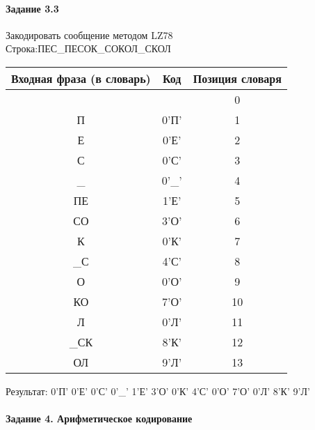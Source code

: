 \documentclass[a4paper, 12pt]{article}
\begin{document}
\paragraph{Задание 3.3}

Закодировать сообщение методом LZ78\\
Строка:ПЕС\_ПЕСОК\_СОКОЛ\_СКОЛ\\
\begin{table}[h!]
\centering
\begin{tabular}{|c|c|c|} 
\hline
 Входная фраза (в словарь) & Код & Позиция словаря \\ \hline

 &  & 0 \\ \hline
П & 0'П' & 1 \\ \hline
Е & 0'Е' & 2 \\ \hline
С & 0'С' & 3 \\ \hline
\_ & 0'\_' & 4 \\ \hline
ПЕ & 1'Е' & 5 \\ \hline
СО & 3'О' & 6 \\ \hline
К & 0'К' & 7 \\ \hline
\_С & 4'С' & 8 \\ \hline
О & 0'О' & 9 \\ \hline
КО & 7'О' & 10 \\ \hline
Л & 0'Л' & 11 \\ \hline
\_СК & 8'К' & 12 \\ \hline
ОЛ & 9'Л' & 13 \\ \hline
\end{tabular}
\end{table}

Результат: 0'П' 0'Е' 0'С' 0'\_' 1'Е' 3'О' 0'К' 4'С' 0'О' 7'О' 0'Л' 8'К' 9'Л'\\
\pagebreak
\paragraph{Задание 4. Арифметическое кодирование\\}
\end{document}
